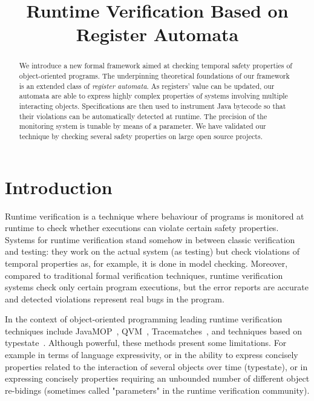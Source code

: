 \documentclass[9pt, preprint]{sigplanconf} %
\title{Runtime Verification Based on Register Automata}
\theoremstyle{definition}
\theoremstyle{remark}
\begin{document}
\maketitle
\begin{abstract} %
We introduce a new formal framework aimed at checking temporal safety properties of object-oriented programs.
The underpinning theoretical foundations of our framework is an extended class of {\em register automata}.
As registers' value can be updated, our automata are able to express highly complex properties of systems involving multiple interacting objects.
Specifications are then used to instrument Java bytecode so that their violations can be automatically detected at runtime.
The precision of the monitoring system is tunable by means of a parameter.
We have validated our technique by checking several safety properties on large open source projects.

\end{abstract}

\section{Introduction} %

Runtime verification is a technique where behaviour of programs is monitored at runtime to check whether executions
can violate certain safety properties.
Systems for runtime verification stand somehow in between classic verification and testing: they work on the actual system (as testing) but check violations of temporal properties as, for example, it is done in model checking. Moreover, compared to traditional formal verification techniques, runtime verification systems check only certain program executions, but the error reports are accurate and detected violations represent real bugs in the program.

In the context of object-oriented programming  leading runtime verification techniques include JavaMOP~\cite{dblp:journals/sttt/meredithjgcr12}, QVM~\cite{arnold:2008}, Tracematches~\cite{dblp:conf/oopsla/allanachklmsst05}, and techniques based on typestate~\cite{strom1986,dblp:conf/oopsla/bierhoffa07,dblp:conf/oopsla/naeeml08,disney2011,ball2002}. Although powerful,  these methods present some limitations. For example  in terms of  language expressivity, or in the ability to express concisely properties related to the interaction of several objects 
over time (typestate), or in expressing concisely properties requiring an unbounded number of different object re-bidings (sometimes called "parameters" in the runtime verification community).
\end{document}
